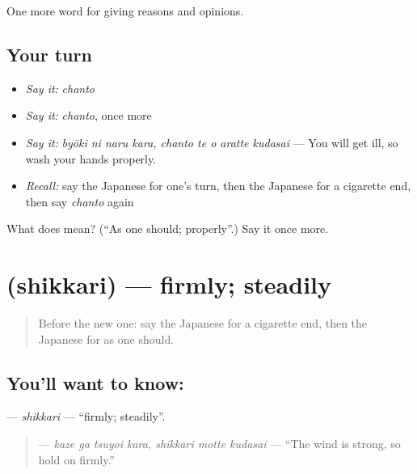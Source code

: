 \begin{grammarlens}[title={What you've built}]
One more word for giving reasons and opinions.
\end{grammarlens}

\subsection*{Your turn}
\begin{itemize}
\raggedright
  \item \emph{Say it:} \emph{chanto}
  \item \emph{Say it:} \emph{chanto}, once more
  \item \emph{Say it:} \emph{byōki ni naru kara, chanto te o aratte kudasai} — You will get ill, so wash your hands properly.
  \item \emph{Recall:} say the Japanese for one's turn, then the Japanese for a cigarette end, then say \emph{chanto} again
\end{itemize}

\begin{tcolorbox}[breakable,colback=teal!4,colframe=teal!35!black,title={Before you move on}]
What does  mean? (\textquotedblleft{}As one should; properly\textquotedblright{}.) Say it once more.
\end{tcolorbox}
\section[\texorpdfstring{\ja{しっかり} (shikkari)}{しっかり (shikkari)}]{ (shikkari) — firmly; steadily}

\label{lesson:JA-C330-shikkari}



\begin{quote}
Before the new one: say the Japanese for a cigarette end, then the Japanese for as one should.
\end{quote}

\subsection*{You'll want to know: }
\textbf{} — \emph{shikkari} — \textquotedblleft{}firmly; steadily\textquotedblright{}.

\begin{quote}
\textbf{   } — \emph{kaze ga tsuyoi kara, shikkari motte kudasai} — \textquotedblleft{}The wind is strong, so hold on firmly.\textquotedblright{}
\end{quote}

